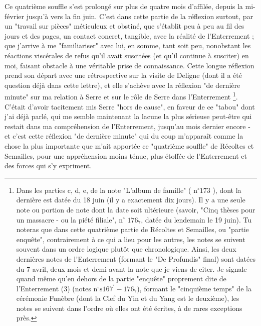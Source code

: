 Ce quatrième souffle s'est prolongé sur plus de quatre mois d'affilée, depuis la mi-février jusqu'à vers la fin juin. C'est dans cette partie de la réflexion surtout, par un "travail sur pièces" méticuleux et obstiné, que s'établit peu à peu au fil des jours et des pages, un contact concret, tangible, avec la réalité de l'Enterrement ; que j'arrive à me "familiariser" avec lui, en somme, tant soit peu, nonobstant les réactions viscérales de refus qu'il avait suscitées (et qu'il continue à susciter) en moi, faisant obstacle à une véritable prise de connaissance. Cette longue réflexion prend son départ avec une rétrospective sur la visite de Deligne (dont il a été question déjà dans cette lettre), et elle s'achève avec la réflexion "de dernière minute" sur ma relation à Serre et sur le rôle de Serre dans l'Enterrement \footnote{Dans les parties c, d, e, de la note "L'album de famille" ( $\mathrm{n}^{\circ} 173$ ), dont la dernière est datée du 18 juin (il y a exactement dix jours). Il y a une seule note ou portion de note dont la date soit ultérieure (savoir, "Cinq thèses pour un massacre - ou la piété filiale", $\mathrm{n}^{\circ}$ $176_{7}$, datée du lendemain le 19 juin). Tu noteras que dans cette quatrième partie de Récoltes et Semailles, ou "partie enquête", contrairement à ce qui a lieu pour les autres, les notes se suivent souvent dans un ordre logique plutôt que chronologique. Ainsi, les deux dernières notes de l'Enterrement (formant le "De Profundis" final) sont datées du 7 avril, deux mois et demi avant la note que je viens de citer. Je signale quand même qu'en dehors de la partie "enquête" proprement dite de l'Enterrement (3) (notes $\mathrm{n}^{\circ} \mathrm{s} 167^{\prime}-176_{7}$), formant le "cinquième temps" de la cérémonie Funèbre (dont la Clef du Yin et du Yang est le deuxième), les notes se suivent dans l'ordre où elles ont été écrites, à de rares exceptions près.}. C'était d'avoir tacitement mis Serre "hors de cause", en faveur de ce "tabou" dont j'ai déjà parlé, qui me semble maintenant la lacune la plus sérieuse peut-être qui restait dans ma compréhension de l'Enterrement, jusqu'au mois dernier encore - et c'est cette réflexion "de dernière minute" qui du coup m'apparaît comme la chose la plus importante que m'ait apportée ce "quatrième souffle" de Récoltes et Semailles, pour une appréhension moins ténue, plus étoffée de l'Enterrement et des forces qui s'y expriment.

